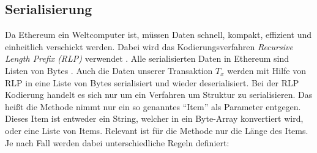 \documentclass[runningheads]{llncs}
\begin{document}
\subsection{Serialisierung}
Da Ethereum ein Weltcomputer ist, müssen Daten schnell, kompakt, effizient und einheitlich verschickt werden. Dabei wird das Kodierungsverfahren \textit{Recursive Length Prefix (RLP)} verwendet \cite[S. 100]{antonopoulos_mastering_2019}. Alle serialisierten Daten in Ethereum sind Listen von Bytes \cite[S. 3]{wood_ethereum/yellowpaper_2019}. Auch die Daten unserer Transaktion $T_x$ werden mit Hilfe von RLP in eine Liste von Bytes serialisiert und wieder deserialisiert. Bei der RLP Kodierung handelt es sich nur um ein Verfahren um Struktur zu serialisieren. Das heißt die Methode nimmt nur ein so genanntes "`Item"' als Parameter entgegen. Dieses Item ist entweder ein String, welcher in ein Byte-Array konvertiert wird, oder eine Liste von Items. Relevant ist für die Methode nur die Länge des Items. Je nach Fall werden dabei unterschiedliche Regeln definiert:
\end{document}
